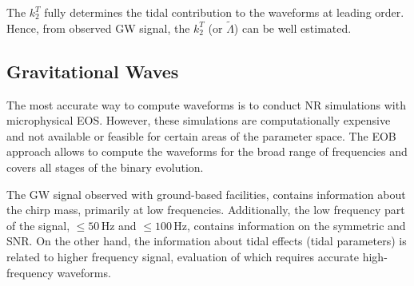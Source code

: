 %
The $k_2^T$ fully determines the tidal contribution to the waveforms at leading order. 
Hence, from observed \ac{GW} signal, the $k_2^T$ (or $\tilde{\Lambda}$) can be well estimated. 
%

\subsection{Gravitational Waves}

The most accurate way to compute waveforms is to conduct \ac{NR} simulations with microphysical 
\ac{EOS}. However, these simulations are computationally expensive and not available or feasible 
for certain areas of the parameter space. The \ac{EOB} approach allows to compute the waveforms 
for the broad range of frequencies and covers all stages of the binary evolution. 

The \ac{GW} signal observed with ground-based facilities, contains information 
about the chirp mass, 
primarily at low frequencies. Additionally, the low frequency part of the signal, 
${\leq}50\,$Hz and ${\leq}100\,$Hz, contains information on the symmetric \mr{} and \ac{SNR}.
On the other hand, the information about tidal effects (tidal parameters) is related to 
higher frequency signal, evaluation of which requires accurate high-frequency waveforms.


